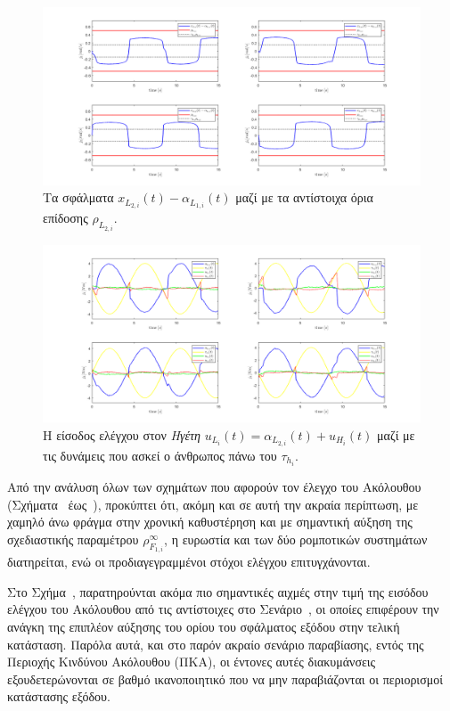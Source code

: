 \begin{figure}[H]
    \centering
    \includegraphics[width=1\linewidth]{Chapters/Chapter3/Figures/Sim3Fig8.png}
    \caption{Τα σφάλματα $x_{L_{2,i}}(t) - \alpha_{L_{1,i}}(t)$ μαζί με τα αντίστοιχα όρια επίδοσης $\rho_{L_{2,i}}$.}
    \label{Sim3Fig8}
\end{figure}

\begin{figure}[H]
    \centering
    \includegraphics[width=1\linewidth]{Chapters/Chapter3/Figures/Sim3Fig9.png}
    \caption{Η είσοδος ελέγχου στον \textit{Ηγέτη} $u_{L_{i}}(t) = \alpha_{L_{2,i}}(t) + u_{H_{i}}(t)$ μαζί με τις δυνάμεις που ασκεί ο άνθρωπος πάνω του $\tau_{h_{i}}$.}
    \label{Sim3Fig9}
\end{figure}

\begin{observation} \label{figobs20} 
Από την ανάλυση όλων των σχημάτων που αφορούν τον έλεγχο του Ακόλουθου (Σχήματα~ έως~), προκύπτει ότι, ακόμη και σε αυτή την ακραία περίπτωση, με χαμηλό άνω φράγμα στην χρονική καθυστέρηση και με σημαντική αύξηση της σχεδιαστικής παραμέτρου $\rho^{\infty}_{F_{1,i}}$, η ευρωστία και των δύο ρομποτικών συστημάτων διατηρείται, ενώ οι προδιαγεγραμμένοι στόχοι ελέγχου επιτυγχάνονται. 
\end{observation}

\begin{observation} \label{figobs21}
Στο Σχήμα~, παρατηρούνται ακόμα πιο σημαντικές αιχμές στην τιμή της εισόδου ελέγχου του Ακόλουθου από τις αντίστοιχες στο Σενάριο~, οι οποίες επιφέρουν την ανάγκη της επιπλέον αύξησης του ορίου του σφάλματος εξόδου στην τελική κατάσταση. Παρόλα αυτά, και στο παρόν ακραίο σενάριο παραβίασης, εντός της Περιοχής Κινδύνου Ακόλουθου (ΠΚΑ), οι έντονες αυτές διακυμάνσεις εξουδετερώνονται σε βαθμό ικανοποιητικό που να μην παραβιάζονται οι περιορισμοί κατάστασης εξόδου.
\end{observation}

\let\cleardoublepage\clearpage